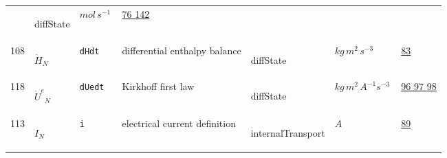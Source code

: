 \begin{longtable}{|p{1cm}|p{2.5cm}|p{4.5cm}|p{8cm}|p{3.0cm}|p{3cm}|p{1cm}|}
             & \begin{lay}diffState \end{lay}
             & $ mol \,s^{-1} \, $
             & \hyperlink{"e:76"}{ 76 }
                 \hyperlink{"e:142"}{ 142 }
                 \\
    108
             & \hypertarget{"v:108"}{ $ {{\dot{H}}}{_{N}} $}
             & \verb|dHdt|
             & differential enthalpy balance
             & \begin{lay}diffState \end{lay}
             & $ kg \,m^{2} \,s^{-3} \, $
             & \hyperlink{"e:83"}{ 83 }
                 \\
    118
             & \hypertarget{"v:118"}{ $ {{\dot{U}^e}}{_{N}} $}
             & \verb|dUedt|
             & Kirkhoff first law
             & \begin{lay}diffState \end{lay}
             & $ kg \,m^{2} \,A^{-1} s^{-3} \, $
             & \hyperlink{"e:96"}{ 96 }
                 \hyperlink{"e:97"}{ 97 }
                 \hyperlink{"e:98"}{ 98 }
                 \\
    113
             & \hypertarget{"v:113"}{ $ {I}{_{N}} $}
             & \verb|i|
             & electrical current definition
             & \begin{lay}internalTransport \end{lay}
             & $ A \, $
             & \hyperlink{"e:89"}{ 89 }
                 \\
    \end{longtable}
